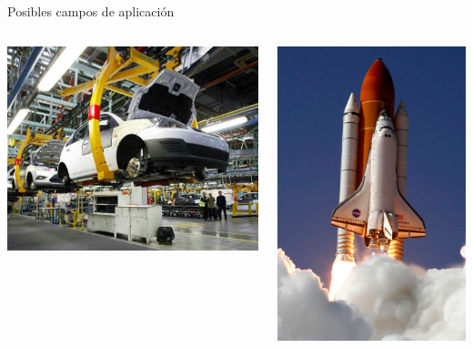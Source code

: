 \documentclass{bredelebeamer}
\begin{document}
\begin{frame}{Posibles campos de aplicación}
\begin{columns}
\begin{column}{0.5\textwidth}
\begin{center}
\includegraphics[scale=0.3]{images/ap4.png}
\end{center}
\end{column}
\begin{column}{0.3\textwidth}
\begin{center}
\includegraphics[scale=0.18]{images/ap5.png}

\end{center}
\end{column}
\end{columns}
\end{frame}
\end{document}
